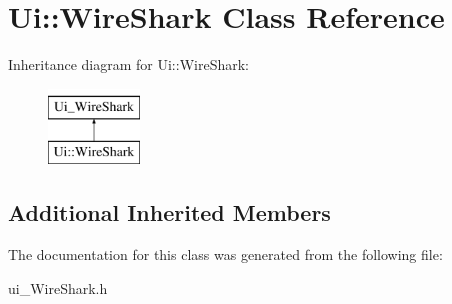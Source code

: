 \hypertarget{class_ui_1_1_wire_shark}{\section{Ui\-:\-:Wire\-Shark Class Reference}
\label{class_ui_1_1_wire_shark}
}
Inheritance diagram for Ui\-:\-:Wire\-Shark\-:\begin{figure}[H]
\begin{center}
\leavevmode
\includegraphics[height=2.000000cm]{class_ui_1_1_wire_shark}
\end{center}
\end{figure}
\subsection*{Additional Inherited Members}


The documentation for this class was generated from the following file\-:\begin{DoxyCompactItemize}
\item 
ui\-\_\-\-Wire\-Shark.\-h\end{DoxyCompactItemize}
